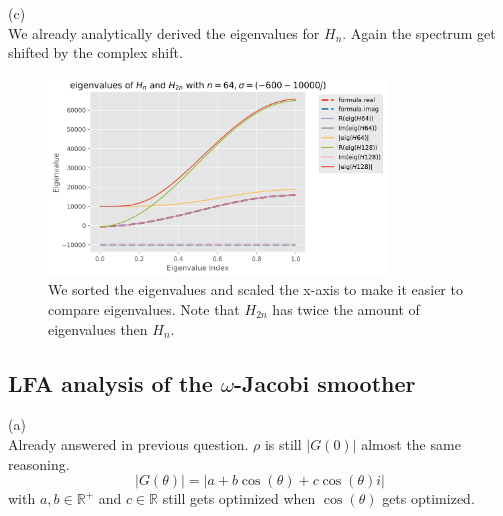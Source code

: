\documentclass[a4paper,12pt]{article}
\begin{document}
(c) \\
We already analytically derived the eigenvalues for $H_{n}$. Again the spectrum get shifted by the complex shift.

\begin{figure}[h!]
    \centering
    \includegraphics[width=0.8\textwidth]{../code/plts/eigenvalues_1Dcomplex.png}
    \caption{We sorted the eigenvalues and scaled the x-axis to make it easier to compare eigenvalues.
        Note that $H_{2n}$ has twice the amount of eigenvalues then $H_{n}$.}
    \label{fig: eigen complex 1D}
\end{figure}


\subsection{LFA analysis of the $\omega$-Jacobi smoother}
(a) \\
Already answered in previous question. $\rho$ is still $|G(0)|$ almost the same reasoning.
\begin{equation}
    |G(\theta)| = |a + b \cos(\theta) + c \cos(\theta)i|
\end{equation}
with $a,b \in \mathbb{R}^{+}$ and $c \in  \mathbb{R}$ still gets optimized when $\cos\left(\theta\right)$
gets optimized.
\end{document}
